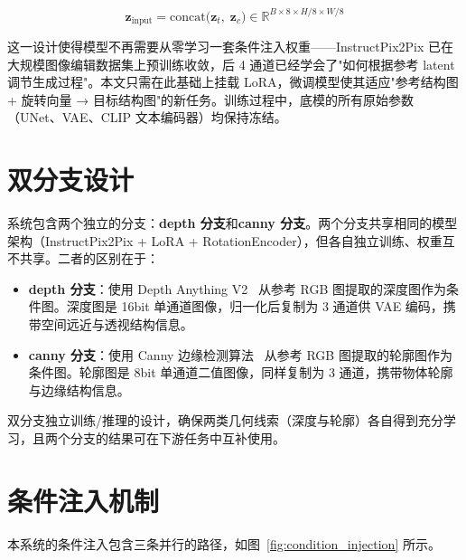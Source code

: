 \begin{equation}
    \mathbf{z}_{\text{input}} = \text{concat}\bigl(\mathbf{z}_t,\; \mathbf{z}_c\bigr) \in \mathbb{R}^{B \times 8 \times H/8 \times W/8}
\end{equation}

这一设计使得模型不再需要从零学习一套条件注入权重——InstructPix2Pix 已在大规模图像编辑数据集上预训练收敛，后 4 通道已经学会了"如何根据参考 latent 调节生成过程"。本文只需在此基础上挂载 LoRA，微调模型使其适应"参考结构图 + 旋转向量 → 目标结构图"的新任务。训练过程中，底模的所有原始参数（UNet、VAE、CLIP 文本编码器）均保持冻结。

\section{双分支设计}

系统包含两个独立的分支：\textbf{depth 分支}和\textbf{canny 分支}。两个分支共享相同的模型架构（InstructPix2Pix + LoRA + RotationEncoder），但各自独立训练、权重互不共享。二者的区别在于：

\begin{itemize}
    \item \textbf{depth 分支}：使用 Depth Anything V2~\cite{yang2024depthanythingv2} 从参考 RGB 图提取的深度图作为条件图。深度图是 16bit 单通道图像，归一化后复制为 3 通道供 VAE 编码，携带空间远近与透视结构信息。
    \item \textbf{canny 分支}：使用 Canny 边缘检测算法~\cite{canny1986edge} 从参考 RGB 图提取的轮廓图作为条件图。轮廓图是 8bit 单通道二值图像，同样复制为 3 通道，携带物体轮廓与边缘结构信息。
\end{itemize}

双分支独立训练/推理的设计，确保两类几何线索（深度与轮廓）各自得到充分学习，且两个分支的结果可在下游任务中互补使用。

\section{条件注入机制}

本系统的条件注入包含三条并行的路径，如图~\ref{fig:condition_injection} 所示。

